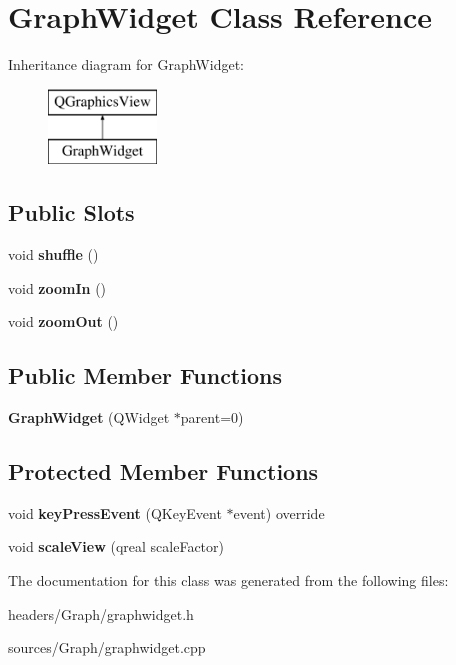 \hypertarget{class_graph_widget}{}\section{Graph\+Widget Class Reference}
\label{class_graph_widget}
Inheritance diagram for Graph\+Widget\+:\begin{figure}[H]
\begin{center}
\leavevmode
\includegraphics[height=2.000000cm]{class_graph_widget}
\end{center}
\end{figure}
\subsection*{Public Slots}
\begin{DoxyCompactItemize}
\item 
\mbox{\label{class_graph_widget_a7d6d1788eba5dcebe750ce08aee4d614}} 
void {\bfseries shuffle} ()
\item 
\mbox{\label{class_graph_widget_a89aa46ebccc40f6ba1e25b2ef18b82cc}} 
void {\bfseries zoom\+In} ()
\item 
\mbox{\label{class_graph_widget_afccca31b4490ec38718b437e78740777}} 
void {\bfseries zoom\+Out} ()
\end{DoxyCompactItemize}
\subsection*{Public Member Functions}
\begin{DoxyCompactItemize}
\item 
\mbox{\label{class_graph_widget_a969641702003abe2dc07ef4db21948fe}} 
{\bfseries Graph\+Widget} (Q\+Widget $\ast$parent=0)
\end{DoxyCompactItemize}
\subsection*{Protected Member Functions}
\begin{DoxyCompactItemize}
\item 
\mbox{\label{class_graph_widget_ac62c85e6775020bf5820048f0e02025d}} 
void {\bfseries key\+Press\+Event} (Q\+Key\+Event $\ast$event) override
\item 
\mbox{\label{class_graph_widget_a53052eaaed3777d102e6659e3357983e}} 
void {\bfseries scale\+View} (qreal scale\+Factor)
\end{DoxyCompactItemize}


The documentation for this class was generated from the following files\+:\begin{DoxyCompactItemize}
\item 
headers/\+Graph/graphwidget.\+h\item 
sources/\+Graph/graphwidget.\+cpp\end{DoxyCompactItemize}
